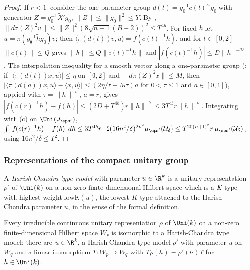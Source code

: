 \begin{proof}
If $r<1$: consider the one-parameter group $d(t)=g_0^{-1}c(t)^\sim g_0$ with generator $Z=g_0^{-1}\tilde X'g_0$, $\|Z\|\le\|g_0\|^2\le Y$. By
, $\|d\pi(Z)^2v\|\le\|Z\|^2(8\sqrt{n+1}(B+2))^2\le T^{4b}$. For fixed $h$ let
$u=\pi(g_0^{-1}\tilde hg_0)v$; then $\langle\pi(d(t))v,u\rangle=f(c(t)^{-1}h)$, and for $t\in[0,2]$, $\|c(t)\|\le Q$ gives $\|h\|\le Q\|c(t)^{-1}h\|$ and
$|f(c(t)^{-1}h)|\le D\|h\|^{-2b}$. The interpolation inequality for a smooth vector along a one-parameter group
(: if $|\langle\pi(d(t))x,u\rangle|\le\eta$ on $[0,2]$ and $\|d\pi(Z)^2x\|\le M$, then
$|\langle\pi(d(a))x,u\rangle-\langle x,u\rangle|\le(2\eta/\tau+M\tau)a$ for $0<\tau\le1$ and $a\in[0,1]$), applied with $\tau=\|h\|^{-b}$, $a=r$, gives
$|f(c(r)^{-1}h)-f(h)|\le(2D+T^{4b})r\|h\|^{-b}\le3T^{4b}r\|h\|^{-b}$. Integrating with (c) on $\Uni(J_{\eps'})$,
$\int|f(c(r)^{-1}h)-f(h)|\,dh\le3T^{4b}r\cdot2(16n^2/\delta)^{2n^2}\mu_{\eps'}(\mathcal U_\delta)\le T^{20(n+1)^2}r\,\mu_{\eps'}(\mathcal U_\delta)$, using
$16n^2/\delta\le T^2$.
\end{proof}

\subsubsection{Representations of the compact unitary group}

A \emph{Harish-Chandra type model} with parameter $u\in\R^k$ is a unitary representation $\rho'$ of $\Uni(k)$ on a non-zero finite-dimensional
Hilbert space which is a $K$-type with highest weight $\mathrm{lowK}(u)$, the lowest $K$-type attached to the Harish-Chandra parameter $u$, in the sense
of the formal definition.

\begin{lemma}\label{pf:fs:hcType}
Every irreducible continuous unitary representation $\rho$ of $\Uni(k)$ on a non-zero finite-dimensional Hilbert space $W_p$ is isomorphic to a
Harish-Chandra type model: there are $u\in\R^k$, a Harish-Chandra type model $\rho'$ with parameter $u$ on $W_q$ and a linear isomorphism
$T\colon W_p\to W_q$ with $T\rho(h)=\rho'(h)T$ for $h\in\Uni(k)$.
\end{lemma}

